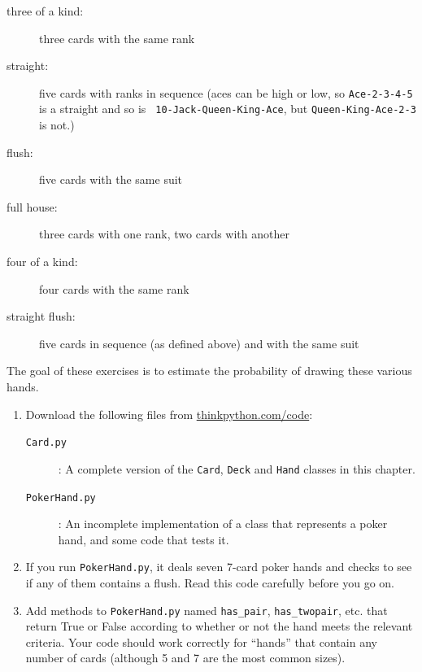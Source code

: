 \documentclass[10pt]{book}
\begin{document}
{\begin{ex}
\begin{description}
\item[three of a kind:] three cards with the same rank
\vspace{-0.05in}

\item[straight:] five cards with ranks in sequence (aces can
be high or low, so {\tt Ace-2-3-4-5} is a straight and so is {\tt
10-Jack-Queen-King-Ace}, but {\tt Queen-King-Ace-2-3} is not.)
\vspace{-0.05in}

\item[flush:] five cards with the same suit
\vspace{-0.05in}

\item[full house:] three cards with one rank, two cards with another
\vspace{-0.05in}

\item[four of a kind:] four cards with the same rank
\vspace{-0.05in}

\item[straight flush:] five cards in sequence (as defined above) and
with the same suit
\vspace{-0.05in}

\end{description}
%
The goal of these exercises is to estimate
the probability of drawing these various hands.

\begin{enumerate}

\item Download the following files from \url{thinkpython.com/code}:

\begin{description}

\item[{\tt Card.py}]: A complete version of the {\tt Card},
{\tt Deck} and {\tt Hand} classes in this chapter.

\item[{\tt PokerHand.py}]: An incomplete implementation of a class
that represents a poker hand, and some code that tests it.

\end{description}
%
\item If you run {\tt PokerHand.py}, it deals seven 7-card poker hands
and checks to see if any of them contains a flush.  Read this
code carefully before you go on.

\item Add methods to {\tt PokerHand.py} named \verb"has_pair",
\verb"has_twopair", etc. that return True or False according to
whether or not the hand meets the relevant criteria.  Your code should
work correctly for ``hands'' that contain any number of cards
(although 5 and 7 are the most common sizes).


\end{enumerate}
\end{ex}}
\end{document}
